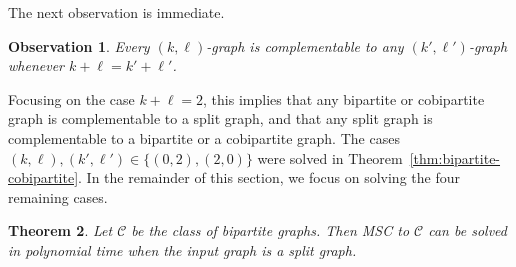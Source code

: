 \documentclass[11pt]{article}
\newtheorem{theorem}{Theorem}
\newtheorem{observation}[theorem]{Observation}
\theoremstyle{definition}
\begin{document}
The next observation is immediate.

\begin{observation}
Every $(k,\ell)$-graph is complementable to any $(k',\ell')$-graph whenever 
$k+\ell = k'+\ell'$.
\end{observation}


Focusing on the case $k+\ell = 2$, this implies that any bipartite or 
cobipartite graph is complementable to a split graph, and that any split graph 
is complementable to a bipartite or a cobipartite graph. The cases 
$(k,\ell),(k',\ell') \in \{(0,2),(2,0)\}$ were solved in 
Theorem~\ref{thm:bipartite-cobipartite}. 
In the remainder of this section, we focus on solving the four remaining cases.

\begin{theorem}
\label{thm:split-bipartite}
Let $\mathcal{C}$ be the class of bipartite graphs.  
Then MSC to $\mathcal{C}$ can be solved in polynomial time when the input graph is a split graph.
\end{theorem}
\end{document}
